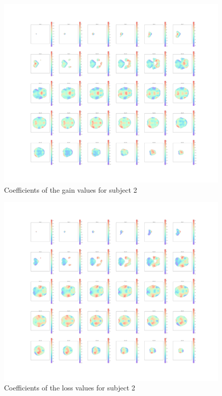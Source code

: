 \begin{figure}[H]
    \centering
        \includegraphics[scale=0.5]{figures/sub2gain_heatmap.png}
    \caption{Coefficients of the gain values for subject 2}
\end{figure}

\begin{figure}[H]
    \centering
        \includegraphics[scale=0.5]{figures/sub2loss_heatmap.png}
    \caption{Coefficients of the loss values for subject 2}
\end{figure}

